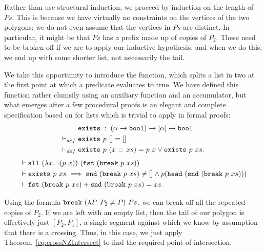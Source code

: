 Rather than use structural induction, we proceed by induction on the length of $Ps$. This is because we have virtually no constraints on the vertices of the two polygons: we do not even assume that the vertices in $Ps$ are distinct. In particular, it might be that $Ps$ has a prefix made up of copies of $P_2$. These need to be broken off if we are to apply our inductive hypothesis, and when we do this, we end up with some shorter list, not necessarily the tail.

We take this opportunity to introduce the  function, which splits a list in two at the first point at which a predicate evaluates to true. We have defined this function rather clumsily using an auxiliary function and an accumulator, but what emerges after a few procedural proofs is an elegant and complete specification based on  for lists which is trivial to apply in formal proofs:
\begin{align*}
&\texttt{exists}\;:\;(\alpha\rightarrow\texttt{bool})\rightarrow [\alpha] \rightarrow \texttt{bool}\\
\vdash_{def}\;&\texttt{exists}\ p\ [] = []\\
\vdash_{def}\;&\texttt{exists}\ p\ (x\,::\,xs) = p\ x \vee \texttt{exists}\ p\ xs.
\end{align*}
\begin{align*}
&\vdash\code{all}\ (\lambda x. \neg(p\ x))\ (\code{fst}\ (\code{break}\ p\ xs))\\
&\vdash\code{exists}\ p\ xs \implies \code{snd}\ (\code{break}\ p\ xs) \neq [] \wedge p (\code{head}\ (\code{snd}\ (\code{break}\ p\ xs)))\\
&\vdash\append{\code{fst}\ (\code{break}\ p\ xs)}{\code{snd}\ (\code{break}\ p\ xs)} = xs.
\end{align*}

Using the formula $\texttt{break}\ (\lambda P.\; P_2 \neq P)\ Ps$, we can break off all the repeated copies of $P_2$. If we are left with an empty list, then the tail of our polygon is effectively just $[P_2,P_1]$, a single segment against which we know by assumption that there is a crossing. Thus, in this case, we just apply Theorem~\ref{eq:crossNZIntersect} to find the required point of intersection. 

